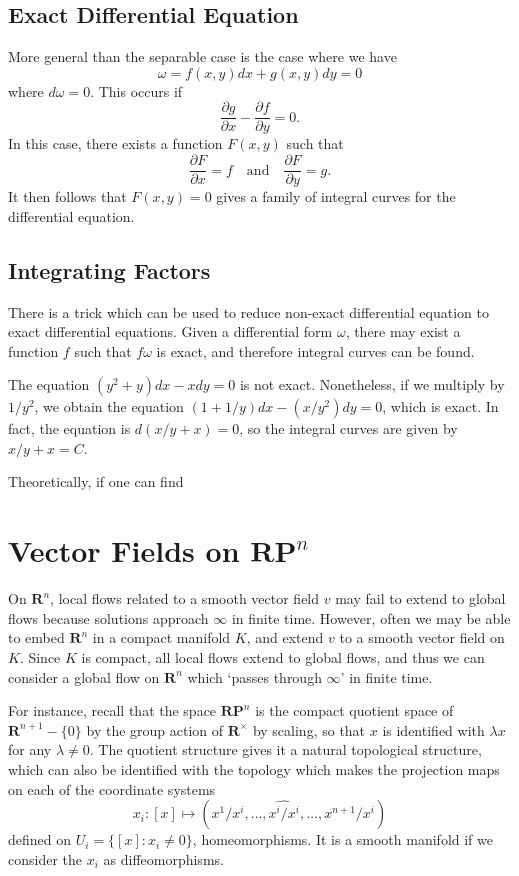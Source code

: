 \section{Exact Differential Equation}

More general than the separable case is the case where we have
%
\[ \omega = f(x,y) dx + g(x,y) dy = 0 \]
%
where $d\omega = 0$. This occurs if
%
\[ \frac{\partial g}{\partial x} - \frac{\partial f}{\partial y} = 0. \]
%
In this case, there exists a function $F(x,y)$ such that
%
\[ \frac{\partial F}{\partial x} = f\quad\text{and}\quad \frac{\partial F}{\partial y} = g. \]
%
It then follows that $F(x,y) = 0$ gives a family of integral curves for the differential equation.

\section{Integrating Factors}

There is a trick which can be used to reduce non-exact differential equation to exact differential equations. Given a differential form $\omega$, there may exist a function $f$ such that $f \omega$ is exact, and therefore integral curves can be found.

\begin{example}
    The equation $(y^2 + y)dx - x dy = 0$ is not exact. Nonetheless, if we multiply by $1/y^2$, we obtain the equation $(1 + 1/y)dx - (x/y^2)dy = 0$, which is exact. In fact, the equation is $d(x/y + x) = 0$, so the integral curves are given by $x/y + x = C$.
\end{example}

Theoretically, if one can find



\chapter{Vector Fields on $\mathbf{RP}^n$}

On $\mathbf{R}^n$, local flows related to a smooth vector field $v$ may fail to extend to global flows because solutions approach $\infty$ in finite time. However, often we may be able to embed $\mathbf{R}^n$ in a compact manifold $K$, and extend $v$ to a smooth vector field on $K$. Since $K$ is compact, all local flows extend to global flows, and thus we can consider a global flow on $\mathbf{R}^n$ which `passes through $\infty$' in finite time.

For instance, recall that the space $\mathbf{RP}^n$ is the compact quotient space of $\mathbf{R}^{n+1} - \{ 0 \}$ by the group action of $\mathbf{R}^\times$ by scaling, so that $x$ is identified with $\lambda x$ for any $\lambda \neq 0$. The quotient structure gives it a natural topological structure, which can also be identified with the topology which makes the projection maps on each of the coordinate systems
%
\[ x_i: [x] \mapsto (x^1/x^i, \dots, \widehat{x^i/x^i}, \dots, x^{n+1}/x^i) \]
%
defined on $U_i = \{ [x] : x_i \neq 0 \}$, homeomorphisms. It is a smooth manifold if we consider the $x_i$ as diffeomorphisms.

